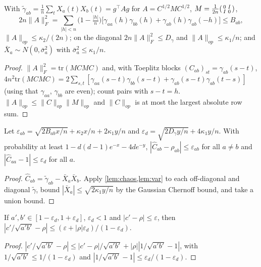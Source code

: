\begin{lemma}\label{lem:var}
With $\tilde\gamma_{ab}=\frac1n\sum_tX_a(t)X_b(t)=g^\top Ag$ for
$A=C^{1/2}MC^{1/2}$, $M=\frac1{2n}\begin{psmallmatrix}0&I\\I&0\end{psmallmatrix}$,
\[
2n\|A\|_F^2=\sum_{|h|<n}\Big(1-\tfrac{|h|}{n}\Big)\big[\gamma_{aa}(h)\gamma_{bb}(h)+\gamma_{ab}(h)\gamma_{ab}(-h)\big]\le B_{ab},
\]
$\|A\|_{op}\le\kappa_2/(2n)$; on the diagonal $2n\|A\|_F^2\le D_\gamma$ and
$\|A\|_{op}\le\kappa_1/n$; and $\bar X_a\sim N(0,\bar\sigma_a^2)$ with
$\bar\sigma_a^2\le\kappa_1/n$.
\end{lemma}
\begin{proof}
$\|A\|_F^2=\mathrm{tr}(MCMC)$ and, with Toeplitz blocks
$(C_{ab})_{st}=\gamma_{ab}(s-t)$,
$4n^2\mathrm{tr}(MCMC)=2\sum_{s,t}[\gamma_{aa}(s-t)\gamma_{bb}(s-t)+\gamma_{ab}(s-t)\gamma_{ab}(t-s)]$
(using that $\gamma_{aa}$, $\gamma_{bb}$ are even); count pairs with $s-t=h$.
$\|A\|_{op}\le\|C\|_{op}\|M\|_{op}$ and $\|C\|_{op}$ is at most the largest
absolute row sum.
\end{proof}

\begin{lemma}\label{lem:dev}
Let $\varepsilon_{ab}=\sqrt{2B_{ab}x/n}+\kappa_2x/n+2\kappa_1y/n$ and
$\varepsilon_d=\sqrt{2D_\gamma y/n}+4\kappa_1y/n$. With probability at least
$1-d(d{-}1)e^{-x}-4de^{-y}$, $|\hat C_{ab}-\rho_{ab}|\le\varepsilon_{ab}$ for all
$a\ne b$ and $|\hat C_{aa}-1|\le\varepsilon_d$ for all $a$.
\end{lemma}
\begin{proof}
$\hat C_{ab}=\tilde\gamma_{ab}-\bar X_a\bar X_b$. Apply \cref{lem:chaos,lem:var}
to each off-diagonal and diagonal $\tilde\gamma$, bound $|\bar X_a|\le
\sqrt{2\kappa_1y/n}$ by the Gaussian Chernoff bound, and take a union bound.
\end{proof}

\begin{lemma}\label{lem:pert}
If $a',b'\in[1-\varepsilon_d,1+\varepsilon_d]$, $\varepsilon_d<1$ and
$|c'-\rho|\le\varepsilon$, then
$|c'/\sqrt{a'b'}-\rho|\le(\varepsilon+|\rho|\varepsilon_d)/(1-\varepsilon_d)$.
\end{lemma}
\begin{proof}
$|c'/\sqrt{a'b'}-\rho|\le|c'-\rho|/\sqrt{a'b'}+|\rho||1/\sqrt{a'b'}-1|$, with
$1/\sqrt{a'b'}\le1/(1-\varepsilon_d)$ and $|1/\sqrt{a'b'}-1|\le\varepsilon_d/(1-\varepsilon_d)$.
\end{proof}

